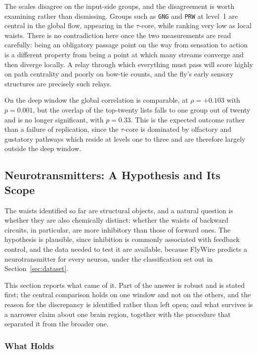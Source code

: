 \documentclass[12pt,a4paper,oneside]{article}
\theoremstyle{definition}
\theoremstyle{plain}
\newcommand{\code}[1]{\texttt{#1}}
\begin{document}
The scales disagree on the input-side groups, and the disagreement is worth
examining rather than dismissing. Groups such as \code{GNG} and \code{PRW}
at level~1 are central in the global flow, appearing in the $\tau$-core,
while ranking very low as local waists. There is no contradiction here once
the two measurements are read carefully: being an obligatory passage point
on the way from sensation to action is a different property from being a
point at which many streams converge and then diverge locally. A relay
through which everything must pass will score highly on path centrality and
poorly on bow-tie counts, and the fly's early sensory structures are
precisely such relays.

On the deep window the global correlation is comparable, at $\rho = +0.103$
with $p = 0.001$, but the overlap of the top-twenty lists falls to one group
out of twenty and is no longer significant, with $p = 0.33$. This is the
expected outcome rather than a failure of replication, since the
$\tau$-core is dominated by olfactory and gustatory pathways which reside at
levels one to three and are therefore largely outside the deep window.

\subsection{Neurotransmitters: A Hypothesis and Its Scope}
\label{sec:results-nt}


The waists identified so far are structural objects, and a natural question
is whether they are also chemically distinct: whether the waists of backward
circuits, in particular, are more inhibitory than those of forward ones. The
hypothesis is plausible, since inhibition is commonly associated with
feedback control, and the data needed to test it are available, because
FlyWire predicts a neurotransmitter for every neuron, under the
classification set out in Section~\ref{sec:dataset}.

This section reports what came of it. Part of the answer is robust and is
stated first; the central comparison holds on one window and not on the
others, and the reason for the discrepancy is identified rather than left
open; and what survives is a narrower claim about one brain region, together
with the procedure that separated it from the broader one.

\subsubsection{What Holds}
\end{document}
